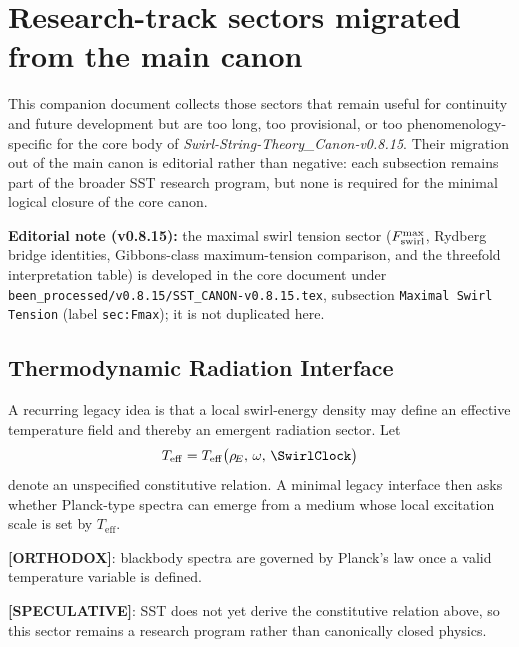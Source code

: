 
\section{Research-track sectors migrated from the main canon}

\noindent
This companion document collects those sectors that remain useful for continuity and future development but are too long, too provisional, or too phenomenology-specific for the core body of \textit{Swirl-String-Theory\_Canon-v0.8.15}. Their migration out of the main canon is editorial rather than negative: each subsection remains part of the broader SST research program, but none is required for the minimal logical closure of the core canon.

\medskip
\noindent
\textbf{Editorial note (v0.8.15):} the maximal swirl tension sector ($F_{\rm swirl}^{\max}$, Rydberg bridge identities, Gibbons-class maximum-tension comparison, and the threefold interpretation table) is developed in the core document under \verb|been_processed/v0.8.15/SST_CANON-v0.8.15.tex|, subsection \texttt{Maximal Swirl Tension} (label \texttt{sec:Fmax}); it is not duplicated here.

\medskip








\subsection{Thermodynamic Radiation Interface}
A recurring legacy idea is that a local swirl-energy density may define an effective temperature field and thereby an emergent radiation sector. Let
\begin{align}
    T_{\mathrm{eff}} = T_{\mathrm{eff}}\big(\rhoE,\, \omega,\, \SwirlClock\big)
\end{align}
denote an unspecified constitutive relation. A minimal legacy interface then asks whether Planck-type spectra can emerge from a medium whose local excitation scale is set by $T_{\mathrm{eff}}$.

\textbf{[ORTHODOX]}: blackbody spectra are governed by Planck's law once a valid temperature variable is defined.

\textbf{[SPECULATIVE]}: SST does not yet derive the constitutive relation above, so this sector remains a research program rather than canonically closed physics.

